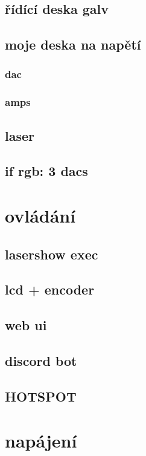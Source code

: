 \documentclass{template/socthesis}
\begin{document}
\subsection{řídící deska galv}
\subsection{moje deska na napětí}
\subsubsection{dac}
\subsubsection{amps}

\subsection{laser}
\subsection{if rgb: 3 dacs}


\section{ovládání}
\subsection{lasershow exec}
\subsection{lcd + encoder}
\subsection{web ui}
\subsection{discord bot}
\subsection{HOTSPOT}

\section{napájení}
\end{document}
